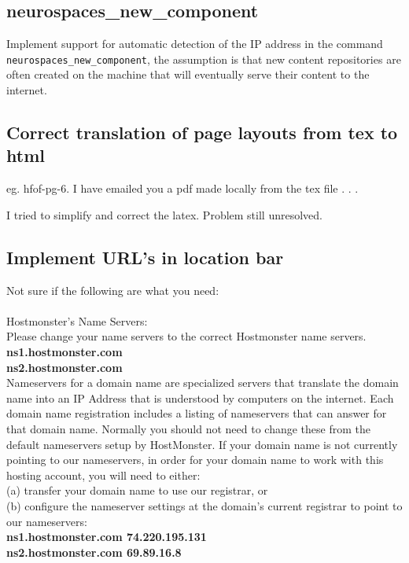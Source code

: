 \documentclass[12pt]{article}
\begin{document}
\subsection{neurospaces\_new\_component}

Implement support for automatic detection of the IP address in the
command {\tt neurospaces\_new\_component}, the assumption is that new
content repositories are often created on the machine that will
eventually serve their content to the internet.


\subsection{Correct translation of page layouts from tex to html}
eg. hfof-pg-6. I have emailed you a pdf made locally from the tex file . . .

I tried to simplify and correct the latex.  Problem still unresolved.


\subsection{Implement URL's in location bar}

Not sure if the following are what you need:\\

\\
Hostmonster's Name Servers:\\
Please change your name servers to the correct Hostmonster name servers.\\
{\bf ns1.hostmonster.com \\
ns2.hostmonster.com} \\

\noindent Nameservers for a domain name are specialized servers that translate the domain name into an IP Address that is understood by computers on the internet. Each domain name registration includes a listing of nameservers that can answer for that domain name. Normally you should not need to change these from the default nameservers setup by HostMonster. If your domain name is not currently pointing to our nameservers, in order for your domain name to work with this hosting account, you will need to either:\\
(a) transfer your domain name to use our registrar, or\\
(b) configure the nameserver settings at the domain's current registrar to point to our nameservers:\\
{\bf ns1.hostmonster.com  74.220.195.131\\
ns2.hostmonster.com  69.89.16.8}\\
\end{document}
